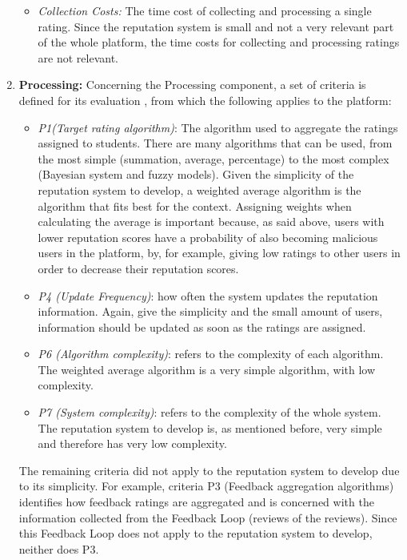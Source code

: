 \begin{enumerate}
\begin{itemize}
\item \textit{Collection Costs:} The time cost of collecting and processing a single rating. Since the reputation system is small and not a very relevant part of the whole platform, the time costs for collecting and processing ratings are not relevant.
\end{itemize} %
\item \textbf{Processing:}
Concerning the Processing component, a set of criteria is defined for its evaluation \cite{liu2012systematic}, from which the following applies to the platform:
\begin{itemize}
\item \textit{P1(Target rating algorithm)}: The algorithm used to aggregate the ratings assigned to students. There are many algorithms that can be used, from the most simple (summation, average, percentage) to the most complex (Bayesian system and fuzzy models). Given the simplicity of the reputation system to develop, a weighted average algorithm is the algorithm that fits best for the context. Assigning weights when calculating the average is important because, as said above, users with lower reputation scores have a probability of also becoming malicious users in the platform, by, for example, giving low ratings to other users in order to decrease their reputation scores.
\item \textit{P4 (Update Frequency)}: how often the system updates the reputation information. Again, give the simplicity and the small amount of users, information should be updated as soon as the ratings are assigned. 
\item \textit{P6 (Algorithm complexity)}: refers to the complexity of each algorithm. The weighted average algorithm is a very simple algorithm, with low complexity.
\item \textit{P7 (System complexity)}: refers to the complexity of the whole system. The reputation system to develop is, as mentioned before, very simple and therefore has very low complexity.
\end{itemize}
The remaining criteria did not apply to the reputation system to develop due to its simplicity. For example, criteria P3 (Feedback aggregation algorithms) identifies how feedback ratings are aggregated and is concerned with the information collected from the Feedback Loop (reviews of the reviews). Since this Feedback Loop does not apply to the reputation system to develop, neither does P3.


\end{enumerate}
